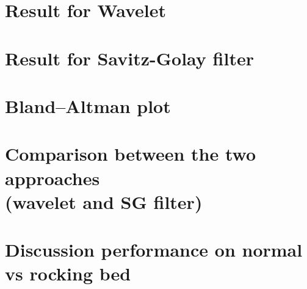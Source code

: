 


\section{Result for Wavelet }
\section{Result for Savitz-Golay filter }
\section{Bland–Altman plot}
\section{Comparison between the two approaches \\ (wavelet and SG filter)}
\section{Discussion performance on normal vs rocking bed }